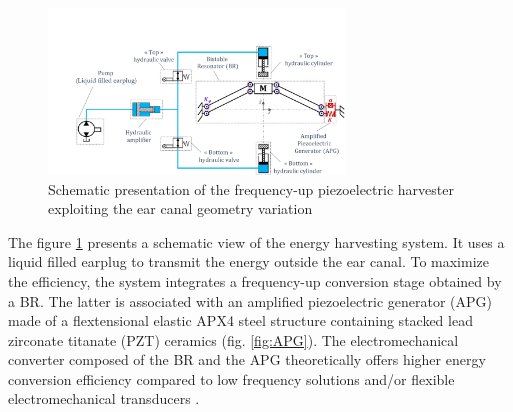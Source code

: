 \documentclass[3p,twocolumn,preprint]{elsarticle}
\begin{document}
\begin{figure}[!htbp]
	\centering
	\captionsetup{justification=centering}
	\includegraphics[trim={3.2cm 0cm 0cm 4.3cm},clip, width=0.7\textwidth]{figures/system_presentation.pdf}
	\caption{Schematic presentation of the frequency-up piezoelectric harvester exploiting the ear canal geometry variation} 
	\label{fig:system_presentation}
\end{figure}
The figure \ref{fig:system_presentation} presents a schematic view of the energy harvesting system. It uses a liquid filled earplug to transmit the energy outside the ear canal. To maximize the efficiency, the system integrates a frequency-up conversion stage obtained by a BR. The latter is associated with an amplified piezoelectric generator (APG) \cite{CEDRATTECHNOLOGIES2022} made of a flextensional elastic APX4 steel \cite{AUBERT&DUVAL2022} structure containing stacked lead zirconate titanate (PZT) ceramics (fig. \ref{fig:APG}). The electromechanical converter composed of the BR and the APG theoretically offers higher energy conversion efficiency compared to low frequency solutions and/or flexible electromechanical transducers \cite{Abdelnaby2016}.
\end{document}
